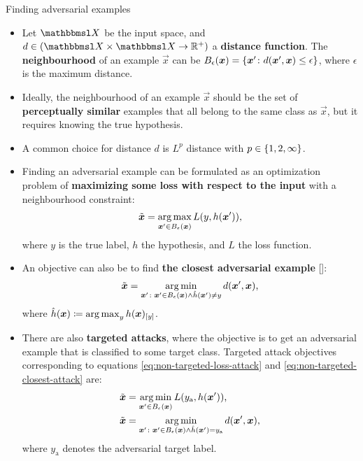 \documentclass{beamer}
\newcommand{\citep}[1]{{\color{citecolor}\relscale{0.8}[\textcite{#1}]}}
\begin{document}
\begin{frame}[allowframebreaks=0.9]{Finding adversarial examples}
\begin{itemize}
	\item Let $\set X$ be the input space,
	and $d\in(\set X\times\set X\to \R^+)$ a \textbf{distance function}. The \textbf{neighbourhood} of an example $\vec x$ can be $B_{\epsilon}(\vec x) = \cbr{\vec x'\colon d(\vec x', \vec x) \leq \epsilon}$,
	where $\epsilon$ is the maximum distance.
	
	\item Ideally, the neighbourhood of an example $\vec x$ should be the set of \textbf{perceptually similar} examples that all belong to the same class as $\vec x$, but it requires knowing the true hypothesis.
	\item A common choice for distance $d$ is $L^p$ distance with $p\in\cbr{1,2,\infty}$.
	
	\item Finding an adversarial example can be formulated as an optimization problem of \textbf{maximizing some loss with respect to the input} with a neighbourhood constraint:
	\begin{align}
	\tilde{\vec x} = \argmax_{\vec x'\in B_\epsilon(\vec x)} L(y, h(\vec x')) \text{,} \label{eq:non-targeted-loss-attack}
	\end{align}
	where $y$ is the true label, $h$ the hypothesis, and $L$ the loss function. 
	\item An objective can also be to find \textbf{the closest adversarial example} \citep{Moosavi-Dezfooli:2016:DFSAMFDNN}:
	\begin{align}
	\tilde{\vec x} = \argmin_{\vec x'\colon \vec x'\in B_\epsilon(\vec x) \land \hat{h}(\vec x') \neq y} d(\vec x', \vec x) \text{,} \label{eq:non-targeted-closest-attack}
	\end{align}
	where $\hat{h}(\vec x) \coloneqq \argmax_{y} h(\vec x)_\ind{y}$.
	\item There are also \textbf{targeted attacks}, where the objective is to get an adversarial example that is classified to some target class. Targeted attack objectives corresponding to equations \eqref{eq:non-targeted-loss-attack} and \eqref{eq:non-targeted-closest-attack} are:
	\begin{align}
	\tilde{\vec x} &= \argmin_{\vec x'\in B_\epsilon(\vec x)} L(y_\text{a}, h(\vec x')) \text{,} \label{eq:targeted-loss-attack} \\
	\tilde{\vec x} &= \argmin_{\vec x'\colon \vec x'\in B_\epsilon(\vec x) \land \hat{h}(\vec x') = y_\text{a}} d(\vec x', \vec x) \text{,} \label{eq:targeted-closest-attack}
	\end{align}
	where $y_\text{a}$ denotes the adversarial target label. 
\end{itemize}
\end{frame}
\end{document}
